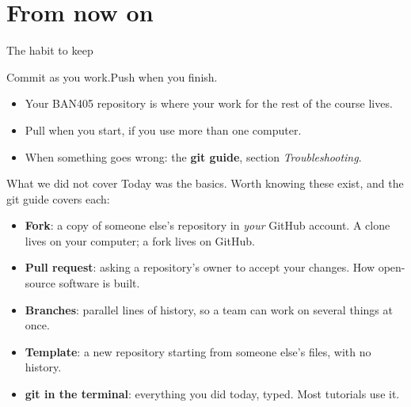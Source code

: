 \documentclass[aspectratio=169,11pt]{beamer}
\newcommand{\key}[1]{\textbf{\textcolor{ban}{#1}}}
\begin{document}
\section{From now on}

\begin{frame}{The habit to keep}
  \begin{center}
    \Large Commit as you work.\quad Push when you finish.
  \end{center}
  \vspace{1em}
  \begin{itemize}
    \item Your BAN405 repository is where your work for the rest of the course lives.
    \item Pull when you start, if you use more than one computer.
    \item When something goes wrong: the \key{git guide}, section \emph{Troubleshooting}.
  \end{itemize}
\end{frame}

\begin{frame}{What we did not cover}
  Today was the basics. Worth knowing these exist, and the git guide covers each:
  \begin{itemize}
    \item \key{Fork}: a copy of someone else's repository in \emph{your} GitHub account. A clone lives on your computer; a fork lives on GitHub.
    \item \key{Pull request}: asking a repository's owner to accept your changes. How open-source software is built.
    \item \key{Branches}: parallel lines of history, so a team can work on several things at once.
    \item \key{Template}: a new repository starting from someone else's files, with no history.
    \item \key{git in the terminal}: everything you did today, typed. Most tutorials use it.
  \end{itemize}
\end{frame}
\end{document}
